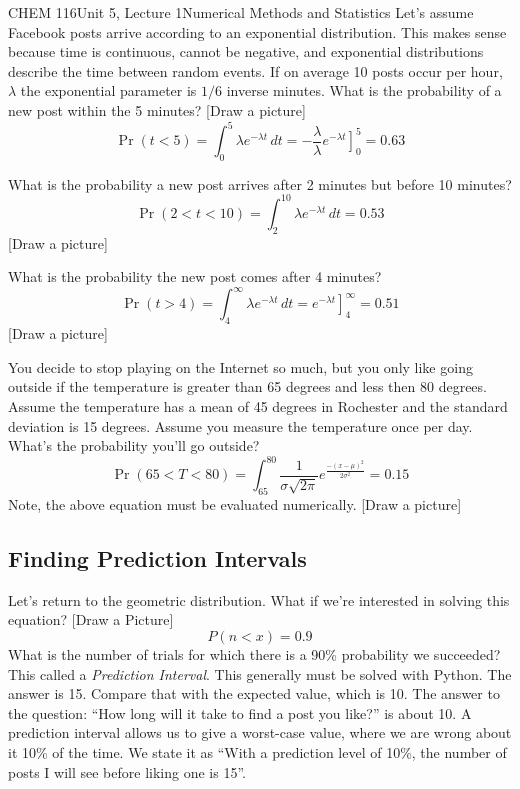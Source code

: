 \documentclass{article}
\begin{document}
\begin{tdoc}{CHEM 116}{Unit 5, Lecture 1}{Numerical Methods and Statistics}
Let's assume Facebook posts arrive according to an exponential
distribution. This makes sense because time is continuous, cannot be
negative, and exponential distributions describe the time between
random events. If on average 10 posts occur per hour, $\lambda$ the
exponential parameter is $1/6$ inverse minutes. What is the probability of a
new post within the 5 minutes? [Draw a picture]
\[
\Pr(t < 5) = \int_0^{5} \lambda e^{-\lambda t}\,dt = -\frac{\lambda}{\lambda}\left.e^{-\lambda t}\right]_0^{5} = 0.63
\]

What is the probability a new post arrives after 2 minutes but before 10 minutes?
\[
\Pr(2 < t < 10) = \int_{2}^{10} \lambda e^{-\lambda t}\,dt  = 0.53
\] 
[Draw a picture]

What is the probability the new post comes after 4 minutes?
\[
\Pr(t > 4) = \int_4^{\infty}  \lambda e^{-\lambda t}\,dt = \left.e^{-\lambda t}\right]_4^{\infty} = 0.51
\]
[Draw a picture]

You decide to stop playing on the Internet so much, but you only like
going outside if the temperature is greater than 65 degrees and less
then 80 degrees. Assume the temperature has a mean of 45 degrees in
Rochester and the standard deviation is 15 degrees. Assume you measure
the temperature once per day. What's the probability you'll go outside?
\[
\Pr(65 < T < 80) = \int_{65}^{80} \frac{1}{\sigma\sqrt{2\pi}}e^{\frac{-(x - \mu)^2}{2\sigma ^2}} = 0.15
\]
Note, the above equation must be evaluated numerically. [Draw a
  picture]

\subsection{Finding Prediction Intervals}

Let's return to the geometric distribution. What if we're interested
in solving this equation? [Draw a Picture]
\[
P(n < x) = 0.9
\] 
What is the number of trials for which there is a 90\% probability we
succeeded? This called a \emph{Prediction Interval}. This generally
must be solved with Python. The answer is 15. Compare that with the
expected value, which is 10. The answer to the question: ``How long
will it take to find a post you like?'' is about 10. A prediction
interval allows us to give a worst-case value, where we are wrong
about it 10\% of the time. We state it as ``With a prediction level of
10\%, the number of posts I will see before liking one is 15''.


\end{tdoc}
\end{document}
